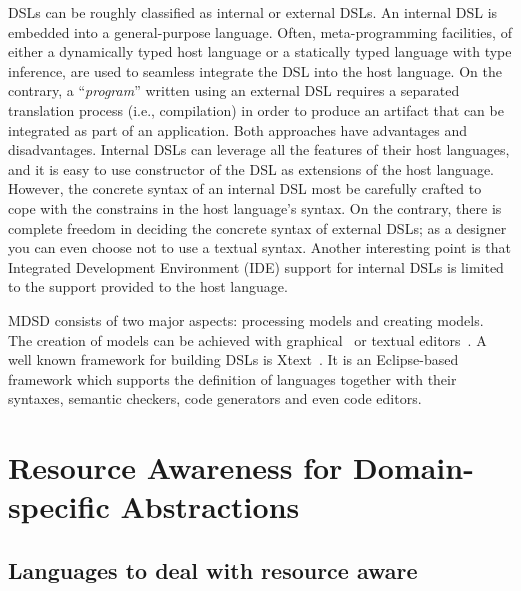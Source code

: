 DSLs can be roughly classified as internal or external DSLs.
An internal DSL is embedded into a general-purpose language.
Often, meta-programming facilities, of either a dynamically typed host language or a statically typed language with type inference, are used to seamless integrate the DSL into the host language.
On the contrary, a ``\textit{program}'' written using an external DSL requires a separated translation process (i.e., compilation) in order to produce an artifact that can be integrated as part of an application.
Both approaches have advantages and disadvantages.
Internal DSLs can leverage all the features of their host languages, and it is easy to use constructor of the DSL as extensions of the host language.
However, the concrete syntax of an internal DSL most be carefully crafted to cope with the constrains in the host language's syntax.
On the contrary, there is complete freedom in deciding the concrete syntax of external DSLs; as a designer you can even choose not to use a textual syntax.
Another interesting point is that Integrated Development Environment (IDE) support for internal DSLs is limited to the support provided to the host language.


MDSD consists of two major aspects: processing models and creating models.
The creation of models can be achieved with graphical~\cite{Kolovos:2009:RLA:1564600.1564699, Biermann:2006:GDI:2087202.2087244} or textual editors~\cite{Merkle:2010:TMT:1869542.1869564}.
A well known framework for building DSLs is Xtext~\cite{Eysholdt:2010:XIY:1869542.1869625}.
It is an Eclipse-based framework which supports the definition of languages together with their syntaxes, semantic checkers, code generators and even code editors.

\section{Resource Awareness for Domain-specific Abstractions} \label{sec:resource-awareness-for-dsl}

\subsection{Languages to deal with resource aware}

